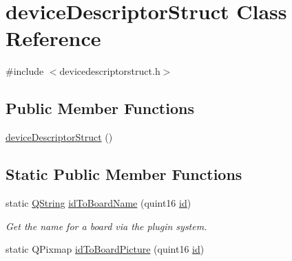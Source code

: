 \hypertarget{classdevice_descriptor_struct}{\section{device\-Descriptor\-Struct Class Reference}
\label{classdevice_descriptor_struct}
}


{\ttfamily \#include $<$devicedescriptorstruct.\-h$>$}

\subsection*{Public Member Functions}
\begin{DoxyCompactItemize}
\item 
\hyperlink{group___u_a_v_object_util_plugin_ga09cd541275c17c51873b51573cacbb5d}{device\-Descriptor\-Struct} ()
\end{DoxyCompactItemize}
\subsection*{Static Public Member Functions}
\begin{DoxyCompactItemize}
\item 
static \hyperlink{group___u_a_v_objects_plugin_gab9d252f49c333c94a72f97ce3105a32d}{Q\-String} \hyperlink{group___u_a_v_object_util_plugin_ga7e79b308b3743586bbaed68286e694e6}{id\-To\-Board\-Name} (quint16 \hyperlink{glext_8h_a58c2a664503e14ffb8f21012aabff3e9}{id})
\begin{DoxyCompactList}\small\item\em Get the name for a board via the plugin system. \end{DoxyCompactList}\item 
static Q\-Pixmap \hyperlink{group___u_a_v_object_util_plugin_ga445e8ccb97ef5d05ed372fbd13532042}{id\-To\-Board\-Picture} (quint16 \hyperlink{glext_8h_a58c2a664503e14ffb8f21012aabff3e9}{id})
\end{DoxyCompactItemize}
